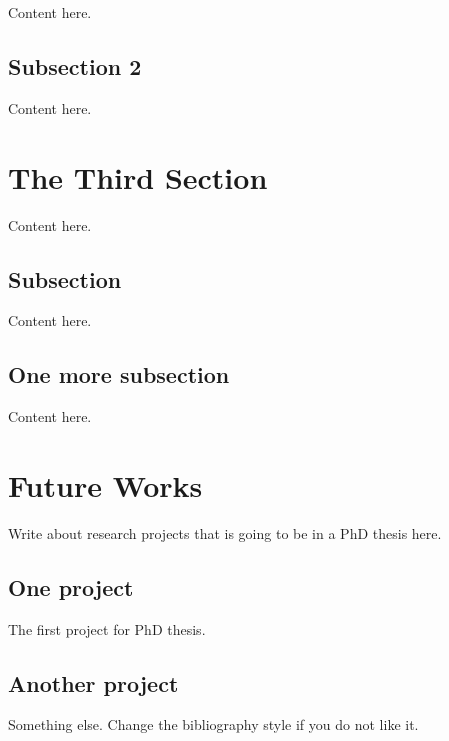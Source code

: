 Content here.

\subsection{Subsection 2}

Content here.

\section{The Third Section}

Content here.

\subsection{Subsection}

Content here.

\subsection{One more subsection}

Content here.

\section{Future Works}

Write about research projects that is going to be in a PhD thesis here.

\subsection{One project}

The first project for PhD thesis.

\subsection{Another project}

Something else. Change the bibliography style if you do not like it.